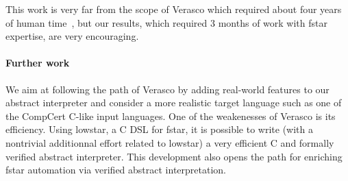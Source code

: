 This work is very far from the scope of Verasco which required about
four years of human
time~\cite{laporte:tel-01285624,jourdan:tel-01327023}, but our
results, which required 3 months of work with \gls{fstar} expertise,
are very encouraging.

\paragraph{Further work} We aim at following the path of Verasco by adding
real-world features to our abstract interpreter and consider a more
realistic target language such as one of the CompCert C-like input
languages.
%
One of the weakenesses of Verasco is its efficiency. Using
\gls{lowstar}, a C DSL for \gls{fstar}, it is possible to write (with
a nontrivial additionnal effort related to \gls{lowstar}) a very
efficient C and formally verified abstract interpreter.
%
This development also opens the path for enriching \gls{fstar}
automation via verified abstract interpretation.

